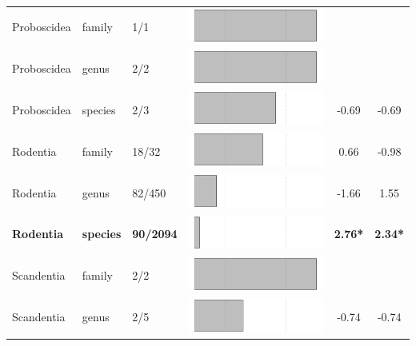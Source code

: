 \begin{longtable}{lL{1.8cm}C{2cm}lcc}
  Proboscidea & family & 1/1 & \includegraphics[width=0.20\linewidth, height=0.05\linewidth]{Supplementaries/Figures/MissingMammals/Results_1c/Table_figures/bar67.pdf} &   &   \\ 
  Proboscidea & genus & 2/2 & \includegraphics[width=0.20\linewidth, height=0.05\linewidth]{Supplementaries/Figures/MissingMammals/Results_1c/Table_figures/bar68.pdf} &   &   \\ 
  Proboscidea & species & 2/3 & \includegraphics[width=0.20\linewidth, height=0.05\linewidth]{Supplementaries/Figures/MissingMammals/Results_1c/Table_figures/bar69.pdf} & -0.69 & -0.69 \\ 
  Rodentia & family & 18/32 & \includegraphics[width=0.20\linewidth, height=0.05\linewidth]{Supplementaries/Figures/MissingMammals/Results_1c/Table_figures/bar70.pdf} & 0.66 & -0.98 \\ 
  Rodentia & genus & 82/450 & \includegraphics[width=0.20\linewidth, height=0.05\linewidth]{Supplementaries/Figures/MissingMammals/Results_1c/Table_figures/bar71.pdf} & -1.66 & 1.55 \\ 
  \textbf{Rodentia} & \textbf{species} & \textbf{90/2094} & \includegraphics[width=0.20\linewidth, height=0.05\linewidth]{Supplementaries/Figures/MissingMammals/Results_1c/Table_figures/bar72.pdf} & \textbf{2.76*} & \textbf{2.34*} \\ 
  Scandentia & family & 2/2 & \includegraphics[width=0.20\linewidth, height=0.05\linewidth]{Supplementaries/Figures/MissingMammals/Results_1c/Table_figures/bar73.pdf} &   &   \\ 
  Scandentia & genus & 2/5 & \includegraphics[width=0.20\linewidth, height=0.05\linewidth]{Supplementaries/Figures/MissingMammals/Results_1c/Table_figures/bar74.pdf} & -0.74 & -0.74 \\ 

\end{longtable}
